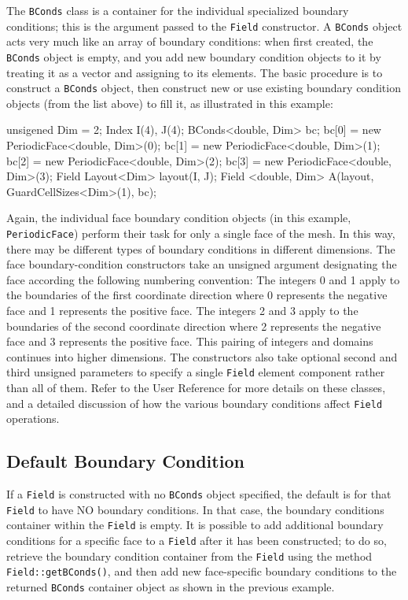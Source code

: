 The \texttt{BConds} class is a container for the individual specialized boundary conditions; this is the argument passed to the \texttt{Field} constructor. A \texttt{BConds} object acts very much like an array of boundary conditions: when first created, the \texttt{BConds} object is empty, and you add new boundary condition objects to it by treating it as a vector and assigning to its elements. The basic procedure is to construct a \texttt{BConds} object, then construct new or use existing boundary condition objects (from the list
above) to fill it, as illustrated in this example: \\
\begin{code}
unsigened Dim = 2;
Index I(4), J(4);
BConds<double, Dim> bc;
bc[0] = new PeriodicFace<double, Dim>(0);
bc[1] = new PeriodicFace<double, Dim>(1);
bc[2] = new PeriodicFace<double, Dim>(2);
bc[3] = new PeriodicFace<double, Dim>(3);
Field Layout<Dim> layout(I, J);
Field <double, Dim> A(layout, GuardCellSizes<Dim>(1), bc);
\end{code}
Again, the individual face boundary condition objects (in this example, \texttt{PeriodicFace}) perform their task for only a single face of the mesh. In this way, there may be different types of boundary conditions in different dimensions. The face boundary-condition constructors take an unsigned argument designating the face according the following numbering convention: The integers 0 and 1 apply to the boundaries of the first coordinate direction where 0 represents the negative face and 1
represents the positive face. The integers 2 and 3 apply to the boundaries of the second coordinate direction where 2 represents the negative face and 3 represents the positive face. This pairing of integers and domains continues into higher dimensions. The constructors also take optional second and third unsigned parameters to specify a single \texttt{Field} element component rather than all of them. Refer to the \ippl User Reference for more details on these classes, and a detailed discussion
of how the various boundary conditions affect \texttt{Field} operations.

\subsection{Default Boundary Condition}

If a \texttt{Field} is constructed with no \texttt{BConds} object specified, the default is for that \texttt{Field} to have NO boundary conditions. In that case, the boundary conditions container within the \texttt{Field} is empty. It is possible to add additional boundary conditions for a specific face to a \texttt{Field} after it has been constructed; to do so, retrieve the boundary condition container from the \texttt{Field} using the method \texttt{Field::getBConds()}, and then add new face-specific boundary conditions to the returned
\texttt{BConds} container object as shown in the previous example.

